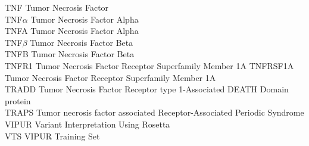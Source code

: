 TNF Tumor Necrosis Factor\\
TNF$\alpha$ Tumor Necrosis Factor Alpha\\
TNFA Tumor Necrosis Factor Alpha\\
TNF$\beta$ Tumor Necrosis Factor Beta\\
TNFB Tumor Necrosis Factor Beta\\
TNFR1 Tumor Necrosis Factor Receptor Superfamily Member 1A
TNFRSF1A Tumor Necrosis Factor Receptor Superfamily Member 1A\\
TRADD Tumor Necrosis Factor Receptor type 1-Associated DEATH Domain protein\\
TRAPS Tumor necrosis factor associated Receptor-Associated Periodic Syndrome\\
VIPUR Variant Interpretation Using Rosetta\\
VTS VIPUR Training Set\\